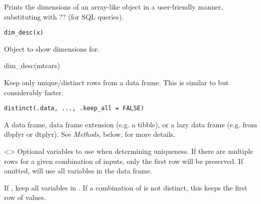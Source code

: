 \documentclass[a4paper]{book}
\begin{document}
%
\begin{Description}
Prints the dimensions of an array-like object in a user-friendly manner,
substituting  with ?? (for SQL queries).
\end{Description}
%
\begin{Usage}
\begin{verbatim}
dim_desc(x)
\end{verbatim}
\end{Usage}
%
\begin{Arguments}
\begin{ldescription}
\item[\code{x}] Object to show dimensions for.
\end{ldescription}
\end{Arguments}
%
\begin{Examples}
\begin{ExampleCode}
dim_desc(mtcars)
\end{ExampleCode}
\end{Examples}
%
\begin{Description}
Keep only unique/distinct rows from a data frame. This is similar
to  but considerably faster.
\end{Description}
%
\begin{Usage}
\begin{verbatim}
distinct(.data, ..., .keep_all = FALSE)
\end{verbatim}
\end{Usage}
%
\begin{Arguments}
\begin{ldescription}
\item[\code{.data}] A data frame, data frame extension (e.g. a tibble), or a
lazy data frame (e.g. from dbplyr or dtplyr). See \emph{Methods}, below, for
more details.

\item[\code{...}] <> Optional variables to
use when determining uniqueness. If there are multiple rows for a given
combination of inputs, only the first row will be preserved. If omitted,
will use all variables in the data frame.

\item[\code{.keep\_all}] If , keep all variables in .
If a combination of  is not distinct, this keeps the
first row of values.
\end{ldescription}
\end{Arguments}
\end{document}
